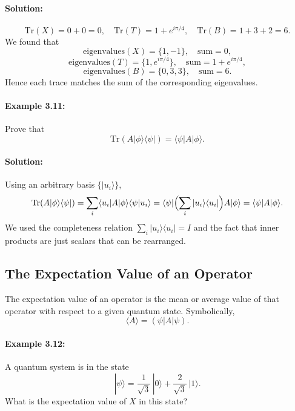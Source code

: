 \documentclass{article}
\begin{document}
\paragraph{Solution:}
\[
\mathrm{Tr}(X) = 0 + 0 = 0,
\quad
\mathrm{Tr}(T) = 1 + e^{i\pi/4},
\quad
\mathrm{Tr}(B) = 1 + 3 + 2 = 6.
\]
We found that
\[
\text{eigenvalues}(X) = \{1, -1\}, \quad 
\text{sum} = 0,
\]
\[
\text{eigenvalues}(T) = \{1, e^{i\pi/4}\}, \quad 
\text{sum} = 1 + e^{i\pi/4},
\]
\[
\text{eigenvalues}(B) = \{0, 3, 3\}, 
\quad
\text{sum} = 6.
\]
Hence each trace matches the sum of the corresponding eigenvalues.

\paragraph{Example 3.11:}
Prove that
\[
\mathrm{Tr}(A|\phi\rangle\langle\psi|) = \langle\psi|A|\phi\rangle.
\]

\paragraph{Solution:}
Using an arbitrary basis \(\{|u_i\rangle\}\),
\[
\mathrm{Tr}(A|\phi\rangle\langle\psi|)
= \sum_i \langle u_i|A|\phi\rangle \langle\psi|u_i\rangle
= \langle\psi|\Bigl(\sum_i |u_i\rangle\langle u_i|\Bigr)A|\phi\rangle
= \langle\psi|A|\phi\rangle.
\]
We used the completeness relation \(\sum_i |u_i\rangle\langle u_i| = I\) and the fact that inner products are just scalars that can be rearranged.

\subsection{The Expectation Value of an Operator}

The expectation value of an operator is the mean or average value of that operator with respect to a given quantum state. Symbolically,
\[
\langle A \rangle = (\psi|A|\psi).
\tag{3.39}
\]

\paragraph{Example 3.12:}
A quantum system is in the state
\[
|\psi\rangle = \frac{1}{\sqrt{3}}\,|0\rangle + \frac{2}{\sqrt{3}}\,|1\rangle.
\]
What is the expectation value of \(X\) in this state?

\bigskip
\end{document}
